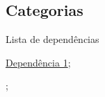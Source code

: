 \subsection{Categorias}
\label{categorias-def}
\begin{titlemize}{Lista de dependências}
	\item \hyperref[dependecia1]{Dependência 1};\\ %
	\item \hyperref[]{};\\
\end{titlemize}
